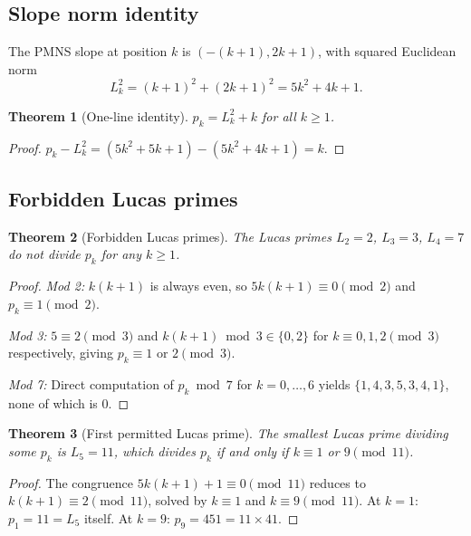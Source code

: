 \documentclass[11pt,a4paper]{article}
\newtheorem{theorem}{Theorem}[section]
\theoremstyle{definition}
\newcommand{\pk}{p_k}
\begin{document}
\subsection{Slope norm identity}

The PMNS slope at position $k$ is $(-(k+1), 2k+1)$,
with squared Euclidean norm
\[
  L_k^2 = (k+1)^2 + (2k+1)^2
         = 5k^2 + 4k + 1.
\]

\begin{theorem}[One-line identity]
\label{thm:identity}
$\pk = L_k^2 + k$ for all $k \geq 1$.
\end{theorem}

\begin{proof}
$\pk - L_k^2 = (5k^2+5k+1) - (5k^2+4k+1) = k$.
\end{proof}

\subsection{Forbidden Lucas primes}

\begin{theorem}[Forbidden Lucas primes]
\label{thm:forbidden}
The Lucas primes $L_2 = 2$, $L_3 = 3$, $L_4 = 7$
do not divide $\pk$ for any $k \geq 1$.
\end{theorem}

\begin{proof}
\textit{Mod 2:} $k(k+1)$ is always even,
so $5k(k+1) \equiv 0 \pmod{2}$ and $\pk \equiv 1 \pmod{2}$.

\textit{Mod 3:} $5 \equiv 2 \pmod{3}$ and
$k(k+1) \bmod 3 \in \{0, 2\}$ for $k \equiv 0, 1, 2 \pmod{3}$
respectively, giving $\pk \equiv 1$ or $2 \pmod{3}$.

\textit{Mod 7:} Direct computation of $\pk \bmod 7$
for $k = 0, \ldots, 6$ yields $\{1, 4, 3, 5, 3, 4, 1\}$,
none of which is $0$.
\end{proof}

\begin{theorem}[First permitted Lucas prime]
\label{thm:first-lucas}
The smallest Lucas prime dividing some $\pk$ is $L_5 = 11$,
which divides $\pk$ if and only if $k \equiv 1$ or $9 \pmod{11}$.
\end{theorem}

\begin{proof}
The congruence $5k(k+1)+1 \equiv 0 \pmod{11}$ reduces to
$k(k+1) \equiv 2 \pmod{11}$, solved by $k \equiv 1$ and
$k \equiv 9 \pmod{11}$.
At $k=1$: $p_1 = 11 = L_5$ itself.
At $k=9$: $p_9 = 451 = 11 \times 41$.
\end{proof}
\end{document}
